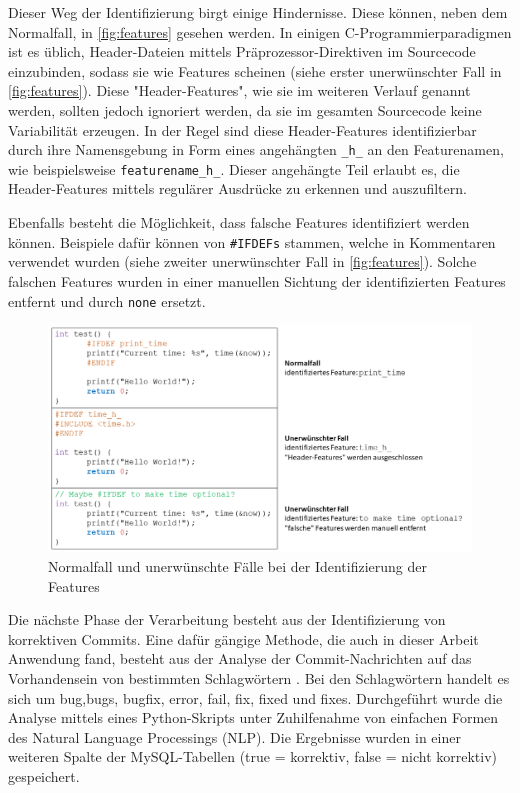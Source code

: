Dieser Weg der Identifizierung birgt einige Hindernisse. Diese können, neben dem Normalfall, in \autoref{fig:features} gesehen werden. In einigen C-Programmierparadigmen ist es üblich, Header-Dateien mittels Präprozessor-Direktiven im Sourcecode einzubinden, sodass sie wie Features scheinen (siehe erster unerwünschter Fall in \autoref{fig:features}). Diese "Header-Features", wie sie im weiteren Verlauf genannt werden, sollten jedoch ignoriert werden, da sie im gesamten Sourcecode keine Variabilität erzeugen. In der Regel sind diese Header-Features identifizierbar durch ihre Namensgebung in Form eines angehängten \texttt{\_h\_} an den Featurenamen, wie beispielsweise \texttt{featurename\_h\_}. Dieser angehängte Teil erlaubt es, die Header-Features mittels regulärer Ausdrücke zu erkennen und auszufiltern. 

Ebenfalls besteht die Möglichkeit, dass \glqq falsche\grqq{} Features identifiziert werden können. Beispiele dafür können von \texttt{\#IFDEFs} stammen, welche in Kommentaren verwendet wurden (siehe zweiter unerwünschter Fall in \autoref{fig:features}). Solche falschen Features wurden in einer manuellen Sichtung der identifizierten Features entfernt und durch \glqq \texttt{none}\grqq{} ersetzt.

\begin{figure}[H]
    \centering
    \includegraphics[width=\textwidth]{images/Features}
    \caption{Normalfall und unerwünschte Fälle bei der Identifizierung der Features\label{fig:features}}
\end{figure}

Die nächste Phase der Verarbeitung besteht aus der Identifizierung von korrektiven Commits. Eine dafür gängige Methode, die auch in dieser Arbeit Anwendung fand, besteht aus der Analyse der Commit-Nachrichten auf das Vorhandensein von bestimmten Schlagwörtern \cite{Zimmermann2007}. Bei den Schlagwörtern handelt es sich um \glqq bug\grqq,\glqq bugs\grqq{}, \glqq bugfix\grqq{}, \glqq error\grqq, \glqq fail\grqq{}, \glqq fix\grqq, \glqq fixed\grqq{} und \glqq fixes\grqq. Durchgeführt wurde die Analyse mittels eines Python-Skripts unter Zuhilfenahme von einfachen Formen des Natural Language Processings (NLP). Die Ergebnisse wurden in einer weiteren Spalte der MySQL-Tabellen (true = korrektiv, false = nicht korrektiv) gespeichert.


